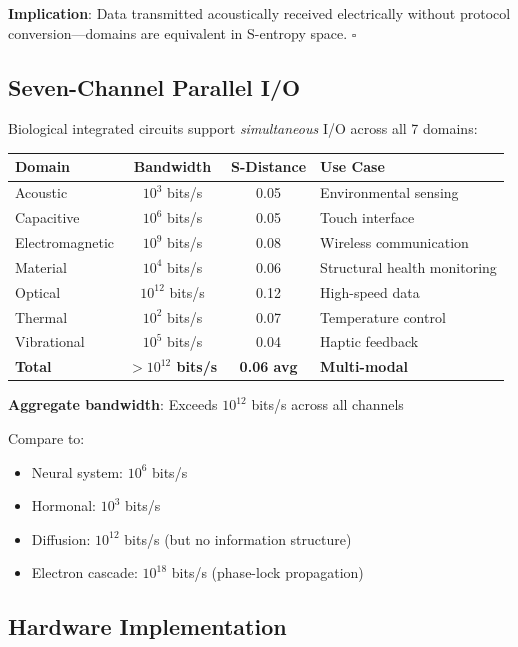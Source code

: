 \documentclass[11pt,a4paper]{article}
\begin{document}
\textbf{Implication}: Data transmitted acoustically received electrically without protocol conversion—domains are equivalent in S-entropy space. $\square$

\subsection{Seven-Channel Parallel I/O}

Biological integrated circuits support \textit{simultaneous} I/O across all 7 domains:

\begin{center}
\begin{tabular}{lccl}
\toprule
\textbf{Domain} & \textbf{Bandwidth} & \textbf{S-Distance} & \textbf{Use Case} \\
\midrule
Acoustic & $10^3$ bits/s & 0.05 & Environmental sensing \\
Capacitive & $10^6$ bits/s & 0.05 & Touch interface \\
Electromagnetic & $10^9$ bits/s & 0.08 & Wireless communication \\
Material & $10^4$ bits/s & 0.06 & Structural health monitoring \\
Optical & $10^{12}$ bits/s & 0.12 & High-speed data \\
Thermal & $10^2$ bits/s & 0.07 & Temperature control \\
Vibrational & $10^5$ bits/s & 0.04 & Haptic feedback \\
\midrule
\textbf{Total} & \textbf{$>10^{12}$ bits/s} & \textbf{0.06 avg} & \textbf{Multi-modal} \\
\bottomrule
\end{tabular}
\end{center}

\textbf{Aggregate bandwidth}: Exceeds $10^{12}$ bits/s across all channels

Compare to:
\begin{itemize}
\item Neural system: $10^6$ bits/s
\item Hormonal: $10^3$ bits/s
\item Diffusion: $10^{12}$ bits/s (but no information structure)
\item Electron cascade: $10^{18}$ bits/s (phase-lock propagation)
\end{itemize}

\subsection{Hardware Implementation}
\end{document}

